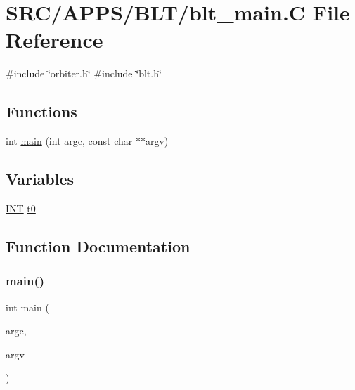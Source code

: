 \hypertarget{blt__main_8_c}{}\section{S\+R\+C/\+A\+P\+P\+S/\+B\+L\+T/blt\+\_\+main.C File Reference}
\label{blt__main_8_c}
{\ttfamily \#include \char`\"{}orbiter.\+h\char`\"{}}\newline
{\ttfamily \#include \char`\"{}blt.\+h\char`\"{}}\newline
\subsection*{Functions}
\begin{DoxyCompactItemize}
\item 
int \mbox{\hyperlink{blt__main_8_c_a217dbf8b442f20279ea00b898af96f52}{main}} (int argc, const char $\ast$$\ast$argv)
\end{DoxyCompactItemize}
\subsection*{Variables}
\begin{DoxyCompactItemize}
\item 
\mbox{\hyperlink{galois_8h_a09fddde158a3a20bd2dcadb609de11dc}{I\+NT}} \mbox{\hyperlink{blt__main_8_c_a4268f4fe222ffb119218a0199f5e1904}{t0}}
\end{DoxyCompactItemize}


\subsection{Function Documentation}
\mbox{\label{blt__main_8_c_a217dbf8b442f20279ea00b898af96f52}} 
\subsubsection{\texorpdfstring{main()}{main()}}
{\footnotesize\ttfamily int main (\begin{DoxyParamCaption}\item[{int}]{argc,  }\item[{const char $\ast$$\ast$}]{argv }\end{DoxyParamCaption})}



